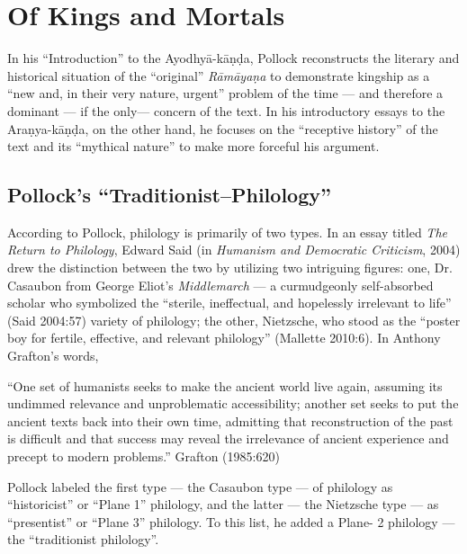 \chapter{Of Kings and Mortals}\label{chapter2} 

In his “Introduction” to the Ayodhyā-kāṇḍa, Pollock reconstructs the literary and historical situation of the “original” {\sl Rāmāyaṇa} to demonstrate kingship as a “new and, in their very nature, urgent” problem of the time --- and therefore a dominant --- if the only--- concern of the text. In his introductory essays to the Araṇya-kāṇḍa, on the other hand, he focuses on the “receptive history” of the text and its “mythical nature” to make more forceful his argument.

\section{Pollock’s “Traditionist–Philology”}\label{sec2.1}

According to Pollock, philology is primarily of two types. In an essay titled {\sl The Return to Philology}, Edward Said (in {\sl Humanism and Democratic Criticism}, 2004) drew the distinction between the two by utilizing two intriguing figures: one, Dr. Casaubon from George Eliot’s {\sl Middlemarch} --- a curmudgeonly self-absorbed scholar who symbolized the “sterile, ineffectual, and hopelessly irrelevant to life” (Said 2004:57) variety of philology; the other, Nietzsche, who stood as the “poster boy for fertile, effective, and relevant philology” (Mallette 2010:6).   In Anthony Grafton’s words, 

\begin{myquote}
“One set of humanists seeks to make the ancient world live again, assuming its undimmed relevance and unproblematic accessibility; another set seeks to put the ancient texts back into their own time, admitting that reconstruction of the past is difficult and that success may reveal the irrelevance of ancient experience and precept to modern problems.” 
\hfill	Grafton (1985:620)
\end{myquote}

Pollock labeled the first type --- the Casaubon type --- of philology as “historicist” or “Plane 1” philology, and the latter --- the Nietzsche type --- as “presentist” or “Plane 3” philology. To this list, he added a Plane- 2 philology --- the “traditionist philology”. 

